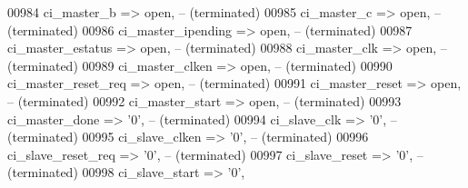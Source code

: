 \begin{DoxyCode}
00984             ci\_master\_b         => \textcolor{keywordflow}{open},\textcolor{keyword}{                                                                   
           -- (terminated)}
00985             ci\_master\_c         => \textcolor{keywordflow}{open},\textcolor{keyword}{                                                                   
           -- (terminated)}
00986             ci\_master\_ipending  => \textcolor{keywordflow}{open},\textcolor{keyword}{                                                                   
           -- (terminated)}
00987             ci\_master\_estatus   => \textcolor{keywordflow}{open},\textcolor{keyword}{                                                                   
           -- (terminated)}
00988             ci\_master\_clk       => \textcolor{keywordflow}{open},\textcolor{keyword}{                                                                   
           -- (terminated)}
00989             ci\_master\_clken     => \textcolor{keywordflow}{open},\textcolor{keyword}{                                                                   
           -- (terminated)}
00990             ci\_master\_reset\_req => \textcolor{keywordflow}{open},\textcolor{keyword}{                                                                   
           -- (terminated)}
00991             ci\_master\_reset     => \textcolor{keywordflow}{open},\textcolor{keyword}{                                                                   
           -- (terminated)}
00992             ci\_master\_start     => \textcolor{keywordflow}{open},\textcolor{keyword}{                                                                   
           -- (terminated)}
00993             ci\_master\_done      => '0',\textcolor{keyword}{                                                                    
           -- (terminated)}
00994             ci\_slave\_clk        => '0',\textcolor{keyword}{                                                                    
           -- (terminated)}
00995             ci\_slave\_clken      => '0',\textcolor{keyword}{                                                                    
           -- (terminated)}
00996             ci\_slave\_reset\_req  => '0',\textcolor{keyword}{                                                                    
           -- (terminated)}
00997             ci\_slave\_reset      => '0',\textcolor{keyword}{                                                                    
           -- (terminated)}
00998             ci\_slave\_start      => '0',\textcolor{keyword}{                                                                    
}
\end{DoxyCode}
